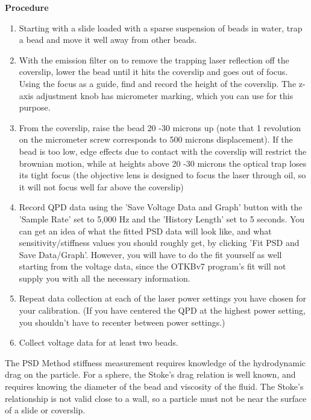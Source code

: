 \documentclass{../lab}
\begin{document}
\textbf{Procedure}

\newpage

\begin{enumerate}
    \item Starting with a slide loaded with a sparse suspension of beads in water, trap a bead and move it well away from other beads.

    \item With the emission filter on to remove the trapping laser reflection off the coverslip, lower the bead until it hits the coverslip and goes out of focus. Using the focus as a guide, find and record the height of the coverslip. The z-axis adjustment knob has micrometer marking, which you can use for this purpose.

    \item From the coverslip, raise the bead 20 -30  microns up (note that 1 revolution on the micrometer screw corresponds to 500 microns displacement). If the bead is too low, edge effects due to contact with the coverslip will restrict the brownian motion, while at heights above 20 -30 microns the optical trap loses its tight focus (the objective lens is designed to focus the laser through oil, so it will not focus well far above the coverslip)

    \item Record QPD data using the 'Save Voltage Data and Graph' button with the 'Sample Rate' set to 5,000 Hz and the 'History Length' set to 5 seconds. You can get an idea of what the fitted PSD data will look like, and what sensitivity/stiffness values you should roughly get, by clicking 'Fit PSD and Save Data/Graph'. However, you will have to do the fit yourself as well starting from the voltage data, since the OTKBv7 program's fit will not supply you with all the necessary information.

    \item Repeat data collection at each of the laser power settings you have chosen for your calibration. (If you have centered the QPD at the highest power setting, you shouldn't have to recenter between power settings.)

    \item Collect voltage data for at least two beads.

\end{enumerate}

The PSD Method stiffness measurement requires knowledge of the hydrodynamic drag on the particle. For a sphere, the Stoke's drag relation is well known, and requires knowing the diameter of the bead and viscosity of the fluid. The Stoke's relationship is not valid close to a wall, so a particle must not be near the surface of a slide or coverslip.
\end{document}
